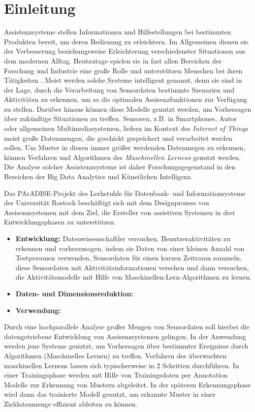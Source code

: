 \chapter{Einleitung}
\label{kap:intro}
Assistenzsysteme stellen Informationen und Hilfestellungen bei bestimmten Produkten bereit, um deren Bedienung zu erleichtern. Im Allgemeinen dienen sie der Verbesserung beziehungsweise Erleichterung verschiedenster Situationen aus dem modernen Alltag.
Heutzutage spielen sie in fast allen Bereichen der Forschung und Industrie eine große Rolle und unterstützen Menschen bei ihren Tätigkeiten \cite{winner2014handbook, kurihata2005rainy, omerdic2011design}.
Meist werden solche Systeme intelligent genannt, denn sie sind in der Lage, durch die Verarbeitung von Sensordaten bestimmte Szenarien und Aktivitäten zu erkennen, um so die optimalen Assisenzfunktionen zur Verfügung zu stellen. Darüber hinaus können diese Modelle genutzt werden, um Vorhersagen über zukünftige Situationen zu treffen.
Sensoren, z.B. in Smartphones, Autos oder allgemeinen Multimediasystemen, liefern im Kontext des \textit{Internet of Things} \cite{xia2012internet, wortmann2015internet}meist große Datenmengen, die geschickt gespeichert und verarbeitet werden sollen. Um Muster in diesen immer größer werdenden Datenmegen zu erkennen, können Verfahren und Algorithmen des \textit{Maschinellen Lernens}\cite{Goodfellow-et-al-2016} genutzt werden. Die Analyse solcher Assistenzsysteme ist daher Forschungsgegenstand in den Bereichen der Big Data Analytics und Künstlichen Intelligenz. 

Das PArADISE-Projekt\cite{paradise} des Lerhstuhls für Datenbank- und Informationsysteme der Universität Rostock beschäftigt sich mit dem Designprozess von Assisenzsystemen mit dem Ziel, die Ersteller von assistiven Systemen in drei Entwicklungsphasen zu unterstützen. 
\begin{itemize}
    \item \textbf{Entwicklung:} Datenwissenschaftler versuchen, Benutzeraktivitäten zu erkennen und vorherzusagen, indem sie Daten von einer kleinen Anzahl von Testpersonen verwenden, Sensordaten für einen kurzen Zeitraum  sammeln, diese Sensordaten mit Aktivitätsinformationen versehen und dann versuchen, die Aktivitätsmodelle mit Hilfe von Maschinellen-Lern-Algorithmen zu lernen.
    \item \textbf{Daten- und Dimensionsreduktion:}
    \item \textbf{Verwendung:}
\end{itemize}Durch eine hochparallele Analyse großer Mengen von Sensordaten soll hierbei die datengetriebene Entwicklung von Assisenzsystemen gelingen. In der Anwendung werden jene Systeme genutzt, um Vorhersagen über bestimmter Ereignisse durch Algorithmen (Maschinelles Lernen) zu treffen. Verfahren des überwachten maschinellen Lernens lassen sich typischerweise in 2 Schritten durchführen. In einer Trainingsphase werden mit Hilfe von Trainingsdaten per Annotation Modelle zur
Erkennung von Mustern abgeleitet. In der späteren Erkennungsphase wird dann das
trainierte Modell genutzt, um erkannte Muster in einer Zieldatenmenge effizient ableiten
zu können. 

